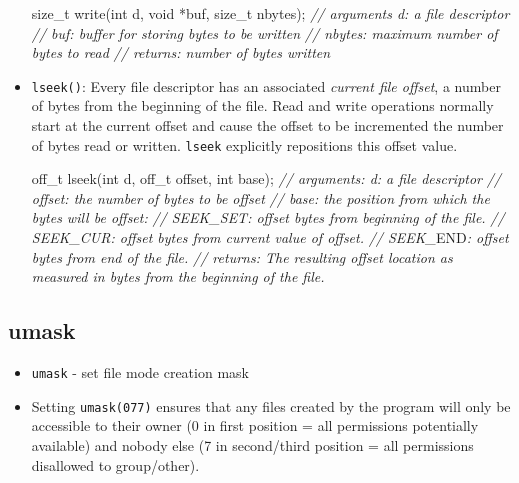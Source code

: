\documentclass[]{article}
\newenvironment{Shaded}{}{}
\newcommand{\DataTypeTok}[1]{\textcolor[rgb]{0.56,0.13,0.00}{#1}}
\newcommand{\CommentTok}[1]{\textcolor[rgb]{0.38,0.63,0.69}{\textit{#1}}}
\newcommand{\RegionMarkerTok}[1]{#1}
\newcommand{\NormalTok}[1]{#1}
\begin{document}
\begin{itemize}
\begin{Shaded}
\begin{Highlighting}[]
\DataTypeTok{size_t}\NormalTok{ write(}\DataTypeTok{int}\NormalTok{ d, }\DataTypeTok{void}\NormalTok{ *buf, }\DataTypeTok{size_t}\NormalTok{ nbytes);}
\CommentTok{// arguments 	d: a file descriptor}
\CommentTok{//				buf: buffer for storing bytes to be written}
\CommentTok{//				nbytes: maximum number of bytes to read }
\CommentTok{// returns:		number of bytes written }
\end{Highlighting}
\end{Shaded}
\item
  \texttt{lseek()}: Every file descriptor has an associated
  \emph{current file offset}, a number of bytes from the beginning of
  the file. Read and write operations normally start at the current
  offset and cause the offset to be incremented the number of bytes read
  or written. \texttt{lseek} explicitly repositions this offset value.

\begin{Shaded}
\begin{Highlighting}[]
\NormalTok{off_t lseek(}\DataTypeTok{int}\NormalTok{ d, off_t offset, }\DataTypeTok{int}\NormalTok{ base);}
\CommentTok{// arguments:	 	d: a file descriptor}
\CommentTok{//					offset:  the number of bytes to be offset}
\CommentTok{//					base:    the position from which the bytes will be offset:}
\CommentTok{//					SEEK_SET:    offset bytes from beginning of the file.}
\CommentTok{//					SEEK_CUR:    offset bytes from current value of offset.}
\CommentTok{//					SEEK_}\RegionMarkerTok{END}\CommentTok{:    offset bytes from end of the file. }
\CommentTok{// returns:			The resulting offset location as measured in bytes from the beginning of the file. }
\end{Highlighting}
\end{Shaded}
\end{itemize}

\subsection{\texorpdfstring{\textbf{umask}}{umask}}\label{header-n413}

\begin{itemize}
\item
  \texttt{umask} - set file mode creation mask
\item
  Setting \texttt{umask(077)} ensures that any files created by the
  program will only be accessible to their owner (0 in first position =
  all permissions potentially available) and nobody else (7 in
  second/third position = all permissions disallowed to group/other).
\end{itemize}
\end{document}
